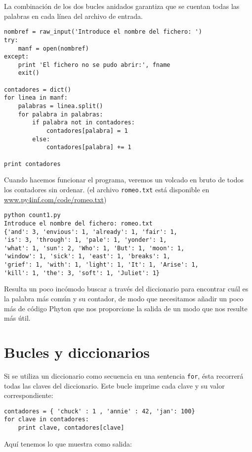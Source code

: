 La combinación de los dos bucles anidados garantiza que se cuentan
todas las palabras en cada línea del archivo de entrada.

\beforeverb
\begin{verbatim}
nombref = raw_input('Introduce el nombre del fichero: ')
try:
    manf = open(nombref)
except:
    print 'El fichero no se pudo abrir:', fname
    exit()

contadores = dict()
for linea in manf:
    palabras = linea.split()
    for palabra in palabras:
        if palabra not in contadores:
            contadores[palabra] = 1
        else:
            contadores[palabra] += 1

print contadores
\end{verbatim}
\afterverb
%
Cuando hacemos funcionar el programa, veremos un volcado en bruto
de todos los contadores sin ordenar.
(el archivo {\tt romeo.txt} está disponible en
\url{www.py4inf.com/code/romeo.txt})

\beforeverb
\begin{verbatim}
python count1.py 
Introduce el nombre del fichero: romeo.txt
{'and': 3, 'envious': 1, 'already': 1, 'fair': 1, 
'is': 3, 'through': 1, 'pale': 1, 'yonder': 1, 
'what': 1, 'sun': 2, 'Who': 1, 'But': 1, 'moon': 1, 
'window': 1, 'sick': 1, 'east': 1, 'breaks': 1, 
'grief': 1, 'with': 1, 'light': 1, 'It': 1, 'Arise': 1, 
'kill': 1, 'the': 3, 'soft': 1, 'Juliet': 1}
\end{verbatim}
\afterverb
%
Resulta un poco incómodo buscar a través del diccionario para encontrar
cuál es la palabra más común y su contador, de modo que necesitamos añadir un poco
más de código Phyton que nos proporcione la salida de un modo que nos resulte más útil.

\section{Bucles y diccionarios}


Si se utiliza un diccionario como secuencia
en una sentencia {\tt for}, ésta recorrerá todas
las claves del diccionario. Este bucle
imprime cada clave y su valor correspondiente:

\beforeverb
\begin{verbatim}
contadores = { 'chuck' : 1 , 'annie' : 42, 'jan': 100}
for clave in contadores:
    print clave, contadores[clave]
\end{verbatim}
\afterverb
%
Aquí tenemos lo que muestra como salida:


